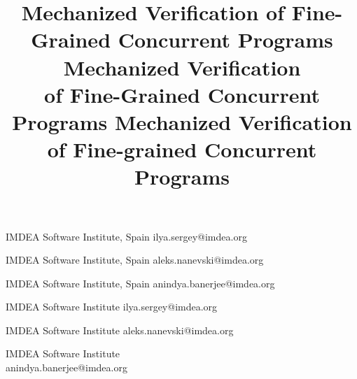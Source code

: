 \documentclass{sigplanconf1}
\begin{document}

\setlength{\pdfpageheight}{\paperheight}
\setlength{\pdfpagewidth}{\paperwidth}



\ifdefined\crflag
{}
           {IMDEA Software Institute, Spain}
           {ilya.sergey@imdea.org}

           {IMDEA Software Institute, Spain}
           {aleks.nanevski@imdea.org}

           {IMDEA Software Institute, Spain}
           {anindya.banerjee@imdea.org}


\else
{}
           {IMDEA Software Institute}
           {ilya.sergey@imdea.org}

           {IMDEA Software Institute}
           {aleks.nanevski@imdea.org}

          {IMDEA Software Institute~~~~~~~~~~~~~~~~~~}
          {anindya.banerjee@imdea.org~~~~~~~~~~~~~~~~~~~~}
\fi

\ifdefined\psflag
   \title{
    \!Mechanized Verification of Fine-Grained Concurrent Programs 
   }
\else
  \ifdefined\crflag
   \title{
    \!Mechanized Verification\\ of Fine-Grained Concurrent Programs 
   }
  \else 
   \title{Mechanized Verification of Fine-grained Concurrent Programs}
  \fi
\fi
\end{document}
